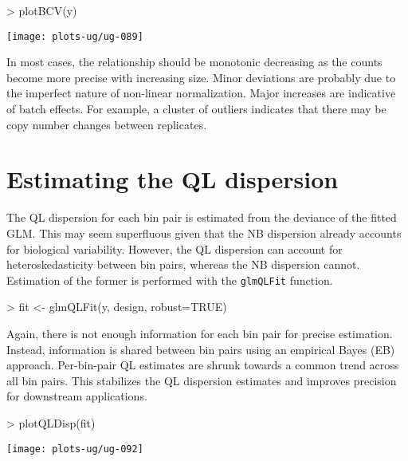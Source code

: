 \documentclass[12pt]{report}
\renewenvironment{Schunk}{\vspace{0pt}}{\vspace{0pt}}
\newcommand{\code}[1]{{\small\texttt{#1}}}
\begin{document}
\begin{Schunk}
\begin{Sinput}
> plotBCV(y)
\end{Sinput}
\end{Schunk}

\begin{center}
\texttt{[image: plots-ug/ug-089]}
\end{center}

In most cases, the relationship should be monotonic decreasing as the counts become more precise with increasing size.
Minor deviations are probably due to the imperfect nature of non-linear normalization.
Major increases are indicative of batch effects.
For example, a cluster of outliers indicates that there may be copy number changes between replicates.

\section{Estimating the QL dispersion}
The QL dispersion for each bin pair is estimated from the deviance of the fitted GLM.
This may seem superfluous given that the NB dispersion already accounts for biological variability.
However, the QL dispersion can account for heteroskedasticity between bin pairs, whereas the NB dispersion cannot.
Estimation of the former is performed with the \code{glmQLFit} function.

\begin{Schunk}
\begin{Sinput}
> fit <- glmQLFit(y, design, robust=TRUE)
\end{Sinput}
\end{Schunk}

Again, there is not enough information for each bin pair for precise estimation.
Instead, information is shared between bin pairs using an empirical Bayes (EB) approach.
Per-bin-pair QL estimates are shrunk towards a common trend across all bin pairs.
This stabilizes the QL dispersion estimates and improves precision for downstream applications.

\begin{Schunk}
\begin{Sinput}
> plotQLDisp(fit)
\end{Sinput}
\end{Schunk}

\begin{center}
\texttt{[image: plots-ug/ug-092]}
\end{center}
\end{document}
